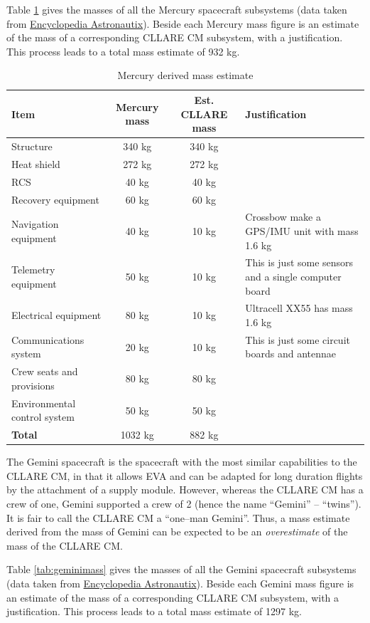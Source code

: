 \documentclass{report}
\begin{document}
Table \ref{tab:mercurymass} gives the masses of all the Mercury spacecraft subsystems (data taken from \href{http://www.astronautix.com/craft/mercury.htm}{Encyclopedia Astronautix}).  Beside each Mercury mass figure is an estimate of the mass of a corresponding CLLARE CM subsystem, with a justification.  This process leads to a total mass estimate of 932 kg.
 
\begin{table}
\centering
\begin{tabular}{|l|c|c|l|}
\hline
Item	& Mercury mass & Est. CLLARE mass & Justification \\
\hline \hline
Structure		& 340 kg	& 340 kg & \\
Heat shield		& 272 kg	& 272 kg & \\
RCS			& 40 kg		& 40 kg & \\
Recovery equipment	& 60 kg		& 60 kg & \\
Navigation equipment	& 40 kg		& 10 kg & Crossbow make a GPS/IMU unit with mass 1.6 kg \\
Telemetry equipment	& 50 kg		& 10 kg & This is just some sensors and a single computer board \\
Electrical equipment	& 80 kg		& 10 kg & Ultracell XX55 has mass 1.6 kg \\
Communications system	& 20 kg		& 10 kg & This is just some circuit boards and antennae \\
Crew seats and provisions & 80 kg	& 80 kg & \\
Environmental control system	& 50 kg		& 50 kg & \\
\hline \hline
\textbf{Total}	& 1032 kg & 882 kg	& \\
\hline
\end{tabular}
\caption{Mercury derived mass estimate}
\label{tab:mercurymass}
\end{table} 

The Gemini spacecraft is the spacecraft with the most similar capabilities to the CLLARE CM, in that it allows EVA and can be adapted for long duration flights by the attachment of a supply module.  However, whereas the CLLARE CM has a crew of one, Gemini supported a crew of 2 (hence the name ``Gemini'' -- ``twins'').  It is fair to call the CLLARE CM a ``one--man Gemini''.  Thus, a mass estimate derived from the mass of Gemini can be expected to be an \emph{overestimate} of the mass of the CLLARE CM.

Table \ref{tab:geminimass} gives the masses of all the Gemini spacecraft subsystems (data taken from \href{http://www.astronautix.com/craft/gemini.htm}{Encyclopedia Astronautix}).  Beside each Gemini mass figure is an estimate of the mass of a corresponding CLLARE CM subsystem, with a justification.  This process leads to a total mass estimate of 1297 kg.
\end{document}
